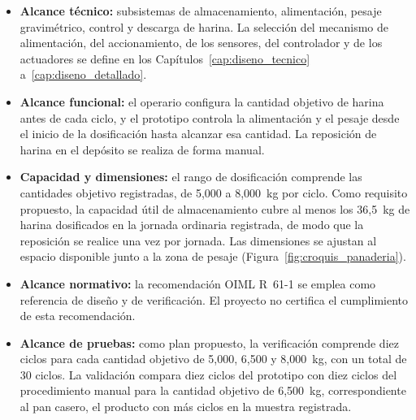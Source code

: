 \begin{itemize}

    \item \textbf{Alcance técnico:} subsistemas de almacenamiento,
    alimentación, pesaje gravimétrico, control y descarga de harina. La
    selección del mecanismo de alimentación, del accionamiento, de los
    sensores, del controlador y de los actuadores se define en los
    Capítulos~\ref{cap:diseno_tecnico} a~\ref{cap:diseno_detallado}.

    \item \textbf{Alcance funcional:} el operario configura la cantidad
    objetivo de harina antes de cada ciclo, y el prototipo controla la
    alimentación y el pesaje desde el inicio de la dosificación hasta
    alcanzar esa cantidad. La reposición de harina en el depósito se realiza
    de forma manual.

    \item \textbf{Capacidad y dimensiones:} el rango de dosificación
    comprende las cantidades objetivo registradas, de 5,000 a 8,000~kg por
    ciclo. Como requisito propuesto, la capacidad útil de almacenamiento
    cubre al menos los 36,5~kg de harina dosificados en la jornada ordinaria
    registrada, de modo que la reposición se realice una vez por jornada.
    Las dimensiones se ajustan al espacio disponible junto a la zona de
    pesaje (Figura~\ref{fig:croquis_panaderia}).

    \item \textbf{Alcance normativo:} la recomendación OIML R~61-1 se emplea
    como referencia de diseño y de verificación. El proyecto no certifica el
    cumplimiento de esta recomendación.

    \item \textbf{Alcance de pruebas:} como plan propuesto, la verificación
    comprende diez ciclos para cada cantidad objetivo de 5,000, 6,500 y
    8,000~kg, con un total de 30 ciclos. La validación compara diez ciclos
    del prototipo con diez ciclos del procedimiento manual para la cantidad
    objetivo de 6,500~kg, correspondiente al pan casero, el producto con más
    ciclos en la muestra registrada.


\end{itemize}
